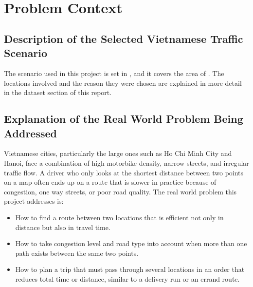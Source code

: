 \chapter{Problem Context}
\label{chap:problem-context}

\section{Description of the Selected Vietnamese Traffic Scenario}


The scenario used in this project is set in , and it covers the area of . The locations involved and the reason they were chosen are explained in more detail in the dataset section of this report.

\section{Explanation of the Real World Problem Being Addressed}

Vietnamese cities, particularly the large ones such as Ho Chi Minh City and Hanoi, face a combination of high motorbike density, narrow streets, and irregular traffic flow. A driver who only looks at the shortest distance between two points on a map often ends up on a route that is slower in practice because of congestion, one way streets, or poor road quality. The real world problem this project addresses is:

\begin{itemize}[itemsep=2pt]
  \item How to find a route between two locations that is efficient not only in distance but also in travel time.
  \item How to take congestion level and road type into account when more than one path exists between the same two points.
  \item How to plan a trip that must pass through several locations in an order that reduces total time or distance, similar to a delivery run or an errand route.
\end{itemize}


